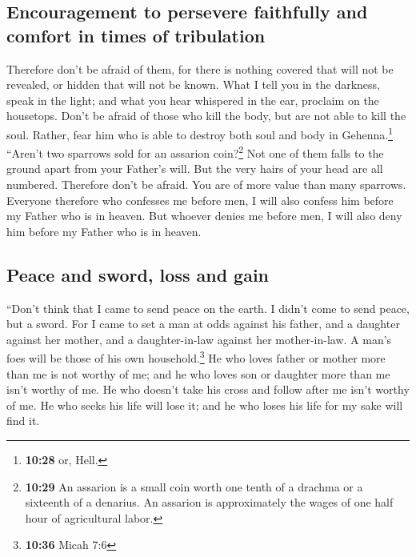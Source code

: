 \hypertarget{encouragement-to-persevere-faithfully-and-comfort-in-times-of-tribulation}{%
\subsection{Encouragement to persevere faithfully and comfort in times
of
tribulation}\label{encouragement-to-persevere-faithfully-and-comfort-in-times-of-tribulation}}

 Therefore don't be afraid of them, for there is nothing
covered that will not be revealed, or hidden that will not be known.
 What I tell you in the darkness, speak in the light; and
what you hear whispered in the ear, proclaim on the housetops.
 Don't be afraid of those who kill the body, but are not
able to kill the soul. Rather, fear him who is able to destroy both soul
and body in Gehenna.\footnote{\textbf{10:28} or, Hell.} 
``Aren't two sparrows sold for an assarion coin?\footnote{\textbf{10:29}
  An assarion is a small coin worth one tenth of a drachma or a
  sixteenth of a denarius. An assarion is approximately the wages of one
  half hour of agricultural labor.} Not one of them falls to the ground
apart from your Father's will.  But the very hairs of
your head are all numbered.  Therefore don't be afraid.
You are of more value than many sparrows.  Everyone
therefore who confesses me before men, I will also confess him before my
Father who is in heaven.  But whoever denies me before
men, I will also deny him before my Father who is in heaven.

\hypertarget{peace-and-sword-loss-and-gain}{%
\subsection{Peace and sword, loss and
gain}\label{peace-and-sword-loss-and-gain}}

 ``Don't think that I came to send peace on the earth. I
didn't come to send peace, but a sword.  For I came to
set a man at odds against his father, and a daughter against her mother,
and a daughter-in-law against her mother-in-law.  A man's
foes will be those of his own household.\footnote{\textbf{10:36} Micah
  7:6}  He who loves father or mother more than me is not
worthy of me; and he who loves son or daughter more than me isn't worthy
of me.  He who doesn't take his cross and follow after me
isn't worthy of me.  He who seeks his life will lose it;
and he who loses his life for my sake will find it.

